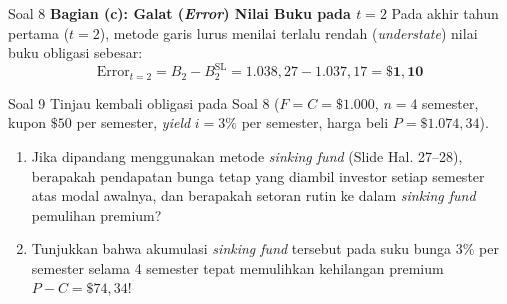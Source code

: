 \documentclass[11pt,a4paper]{article}
\begin{document}
\begin{solutionbox}{Soal 8}
\textbf{Bagian (c): Galat (\textit{Error}) Nilai Buku pada $t = 2$}
Pada akhir tahun pertama ($t=2$), metode garis lurus menilai terlalu rendah (\textit{understate}) nilai buku obligasi sebesar:
\begin{equation*}
    \text{Error}_{t=2} = B_2 - B_2^{\text{SL}} = 1.038{,}27 - 1.037{,}17 = \mathbf{\$1{,}10}
\end{equation*}
\end{solutionbox}

\vspace{1.2em}

\begin{problembox}[Bobot: Standar Slide Hal. 27--29 / Pendekatan Sinking Fund ($j = i$)]{Soal 9}
Tinjau kembali obligasi pada Soal 8 ($F = C = \$1.000$, $n = 4$ semester, kupon $\$50$ per semester, \textit{yield} $i = 3\%$ per semester, harga beli $P = \$1.074{,}34$).
\begin{enumerate}[label=(\alph*)]
    \item Jika dipandang menggunakan metode \textit{sinking fund} (Slide Hal. 27--28), berapakah pendapatan bunga tetap yang diambil investor setiap semester atas modal awalnya, dan berapakah setoran rutin ke dalam \textit{sinking fund} pemulihan premium?
    \item Tunjukkan bahwa akumulasi \textit{sinking fund} tersebut pada suku bunga $3\%$ per semester selama 4 semester tepat memulihkan kehilangan premium $P - C = \$74{,}34$!
\end{enumerate}
\end{problembox}
\end{document}
